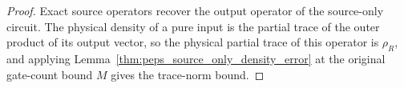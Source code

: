 \begin{proof}\leanok
    Exact source operators recover the output operator of the source-only
    circuit. The physical density of a pure input is the partial trace of the
    outer product of its output vector, so the physical partial trace of
    this operator is $\rho_R$, and applying
    Lemma~\ref{thm:peps_source_only_density_error} at the original
    gate-count bound $M$ gives the trace-norm bound.
\end{proof}
